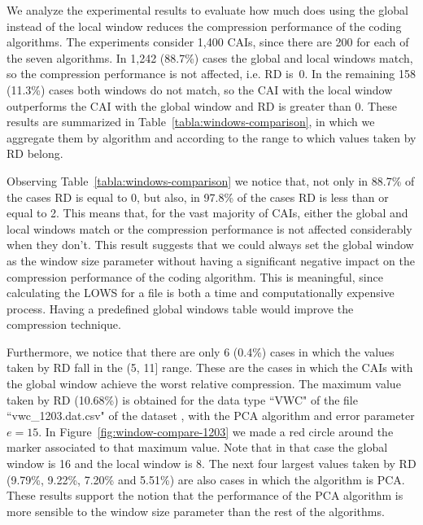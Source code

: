\clearpage


\clearpage


We analyze the experimental results to evaluate how much does using the global instead of the local window reduces the compression performance of the coding algorithms. The experiments consider 1,400 CAIs, since there are 200 for each of the seven algorithms. In 1,242 (88.7\%) cases the global and local windows match, so the compression performance is not affected, i.e. RD is~0. In the remaining 158 (11.3\%) cases both windows do not match, so the CAI with the local window outperforms the CAI with the global window and RD is greater than 0. These results are summarized in Table~\ref{tabla:windows-comparison}, in which we aggregate them by algorithm and according to the range to which values taken by RD belong.


\vspace{+5pt}

\vspace{-5pt}


Observing Table~\ref{tabla:windows-comparison} we notice that, not only in 88.7\% of the cases RD is equal to 0, but also, in 97.8\% of the cases RD is less than or equal to 2. This means that, for the vast majority of CAIs, either the global and local windows match or the compression performance is not affected considerably when they don't. This result suggests that we could always set the global window as the window size parameter without having a significant negative impact on the compression performance of the coding algorithm. This is meaningful, since calculating the LOWS for a file is both a time and computationally expensive process. Having a predefined global windows table would improve the compression technique.


Furthermore, we notice that there are only 6 (0.4\%) cases in which the values taken by RD fall in the (5, 11] range. These are the cases in which the CAIs with the global window achieve the worst relative compression. The maximum value taken by RD (10.68\%) is obtained for the data type ``VWC" of the file ``vwc\_1203.dat.csv" of the dataset \datasetsst, with the PCA algorithm and error parameter $e=15$. In Figure~\ref{fig:window-compare-1203} we made a red circle around the marker associated to that maximum value. Note that in that case the global window is 16 and the local window is 8. The next four largest values taken by RD (9.79\%, 9.22\%, 7.20\% and 5.51\%) are also cases in which the algorithm is PCA. These results support the notion that the performance of the PCA algorithm is more sensible to the window size parameter than the rest of the algorithms.